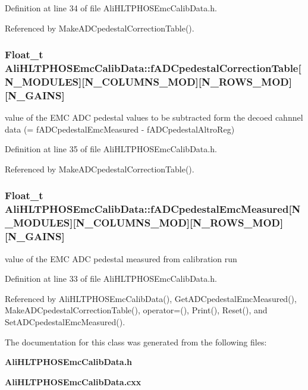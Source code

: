 Definition at line 34 of file Ali\-HLTPHOSEmc\-Calib\-Data.h.

Referenced by Make\-ADCpedestal\-Correction\-Table().
\subsubsection{\setlength{\rightskip}{0pt plus 5cm}Float\_\-t {\bf Ali\-HLTPHOSEmc\-Calib\-Data::f\-ADCpedestal\-Correction\-Table}[N\_\-MODULES][N\_\-COLUMNS\_\-MOD][N\_\-ROWS\_\-MOD][N\_\-GAINS]\hspace{0.3cm}{\tt  [protected]}}\label{classAliHLTPHOSEmcCalibData_p3}


value of the EMC ADC pedestal values to be subtracted form the decoed cahnnel data (= f\-ADCpedestal\-Emc\-Measured - f\-ADCpedestal\-Altro\-Reg) 

Definition at line 35 of file Ali\-HLTPHOSEmc\-Calib\-Data.h.

Referenced by Make\-ADCpedestal\-Correction\-Table().
\subsubsection{\setlength{\rightskip}{0pt plus 5cm}Float\_\-t {\bf Ali\-HLTPHOSEmc\-Calib\-Data::f\-ADCpedestal\-Emc\-Measured}[N\_\-MODULES][N\_\-COLUMNS\_\-MOD][N\_\-ROWS\_\-MOD][N\_\-GAINS]\hspace{0.3cm}{\tt  [protected]}}\label{classAliHLTPHOSEmcCalibData_p1}


value of the EMC ADC pedestal measured from calibration run 

Definition at line 33 of file Ali\-HLTPHOSEmc\-Calib\-Data.h.

Referenced by Ali\-HLTPHOSEmc\-Calib\-Data(), Get\-ADCpedestal\-Emc\-Measured(), Make\-ADCpedestal\-Correction\-Table(), operator=(), Print(), Reset(), and Set\-ADCpedestal\-Emc\-Measured().

The documentation for this class was generated from the following files:\begin{CompactItemize}
\item 
{\bf Ali\-HLTPHOSEmc\-Calib\-Data.h}\item 
{\bf Ali\-HLTPHOSEmc\-Calib\-Data.cxx}\end{CompactItemize}
